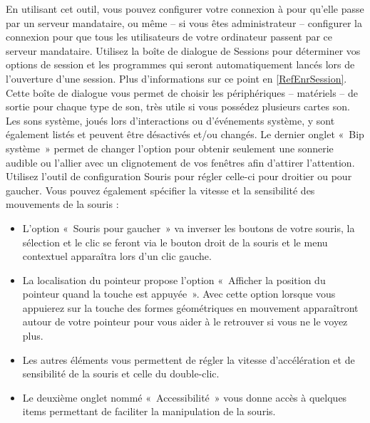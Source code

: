 En utilisant cet outil, vous pouvez configurer votre connexion à  pour qu'elle passe par un serveur mandataire, ou même -- si vous êtes administrateur -- configurer la connexion pour que tous les utilisateurs de votre ordinateur passent par ce serveur mandataire.
Utilisez la boîte de dialogue de Sessions pour déterminer vos options de session et les programmes qui seront automatiquement lancés lors de l'ouverture d'une session. Plus d'informations sur ce point en \ref{RefEnrSession}.
Cette boîte de dialogue vous permet de choisir les périphériques -- matériels -- de sortie pour chaque type de son, très utile si vous possédez plusieurs cartes son. Les sons système, joués lors d'interactions ou d'événements système, y sont également listés et peuvent être désactivés et/ou changés. Le dernier onglet «~Bip système~» permet de changer l'option pour obtenir seulement une sonnerie audible ou l'allier avec un clignotement de vos fenêtres afin d'attirer l'attention. 
Utilisez l'outil de configuration Souris pour régler celle-ci pour droitier ou pour gaucher. Vous pouvez également spécifier la vitesse et la sensibilité des mouvements de la souris :
\begin{itemize}
\item L'option «~Souris pour gaucher~» va inverser les boutons de votre souris, la sélection et le clic se feront via le bouton droit de la souris et le menu contextuel apparaîtra lors d'un clic gauche.
\item La localisation du pointeur propose l'option «~Afficher la position du pointeur quand la touche  est appuyée~». Avec cette option lorsque vous appuierez sur la touche  des formes géométriques en mouvement apparaîtront autour de votre pointeur pour vous aider à le retrouver si vous ne le voyez plus.
\item Les autres éléments vous permettent de régler la vitesse d'accélération et de sensibilité de la souris et celle du double-clic.
\item Le deuxième onglet nommé «~Accessibilité~» vous donne accès à quelques items permettant de faciliter la manipulation de la souris.
\end{itemize}
